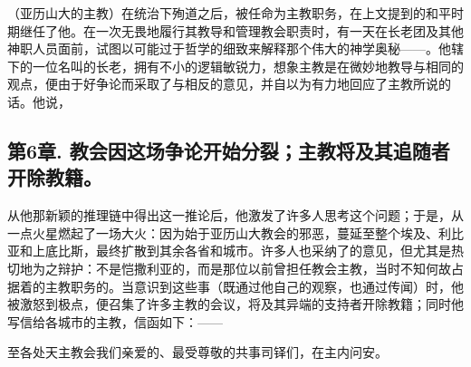 （亚历山大的主教）在统治下殉道之后，被任命为主教职务，在上文提到的和平时期继任了他。在一次无畏地履行其教导和管理教会职责时，有一天在长老团及其他神职人员面前，试图以可能过于哲学的细致来解释那个伟大的神学奥秘——。他辖下的一位名叫的长老，拥有不小的逻辑敏锐力，想象主教是在微妙地教导与相同的观点，便由于好争论而采取了与相反的意见，并自以为有力地回应了主教所说的话。他说，\par


\subsection{第6章. 教会因这场争论开始分裂；主教将及其追随者开除教籍。}

从他那新颖的推理链中得出这一推论后，他激发了许多人思考这个问题；于是，从一点火星燃起了一场大火：因为始于亚历山大教会的邪恶，蔓延至整个埃及、利比亚和上底比斯，最终扩散到其余各省和城市。许多人也采纳了的意见，但尤其是热切地为之辩护：不是恺撒利亚的，而是那位以前曾担任教会主教，当时不知何故占据着的主教职务的。当意识到这些事（既通过他自己的观察，也通过传闻）时，他被激怒到极点，便召集了许多主教的会议，将及其异端的支持者开除教籍；同时他写信给各城市的主教，信函如下：——\par

\par

至各处天主教会我们亲爱的、最受尊敬的共事司铎们，在主内问安。\par

